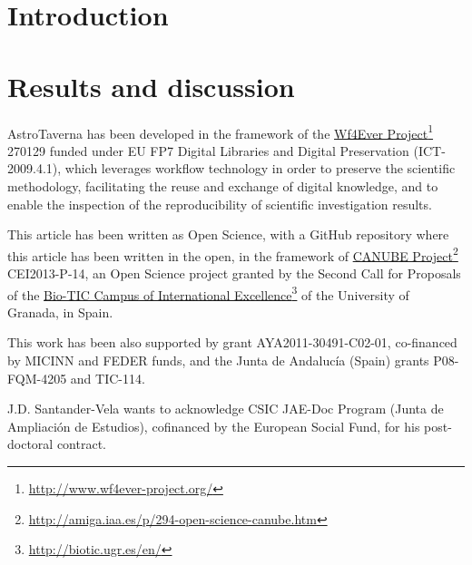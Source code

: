 \documentclass{aa}
\newcommand{\urlsamefont}[1]{\urlstyle{same}\url{#1}}
\newcommand{\hrefnote}[2]{\href{#1}{#2}\footnote{\urlsamefont{#1}}}
\begin{document}

\section{Introduction} %
\label{sec:introduction}


\section{Results and discussion} %
\label{sec:results_and_discussion}


\begin{acknowledgements}

AstroTaverna has been developed in the framework of the \hrefnote{http://www.wf4ever-project.org/}{Wf4Ever Project} 270129 funded under EU FP7 Digital Libraries and Digital Preservation (ICT-2009.4.1), which leverages workflow technology in order to preserve the scientific methodology, facilitating the reuse and exchange of digital knowledge, and to enable the inspection of the reproducibility of scientific investigation results.

This article has been written as Open Science, with a GitHub repository where this article has been written in the open, in the framework of \hrefnote{http://amiga.iaa.es/p/294-open-science-canube.htm}{CANUBE Project} CEI2013-P-14, an Open Science project granted by the Second Call for Proposals of the \hrefnote{http://biotic.ugr.es/en/}{Bio-TIC Campus of International Excellence} of the University of Granada, in Spain.

This work has been also supported by grant AYA2011-30491-C02-01, co-financed by MICINN and FEDER funds, and the Junta de Andalucía (Spain) grants P08-FQM-4205 and TIC-114.

J.D. Santander-Vela wants to acknowledge CSIC JAE-Doc Program (Junta de Ampliaci\'on de Estudios), cofinanced by the European Social Fund, for his post-doctoral contract.

\end{acknowledgements}


\end{document}
